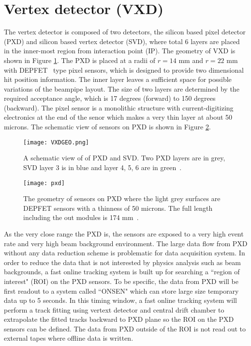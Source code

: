 \section{Vertex detector (VXD)}
The vertex detector is composed of two detectors, the silicon based pixel detector (PXD) and silicon based vertex detector (SVD), where total 6 layers are placed in the inner-most region from interaction point (IP).  The geometry of VXD is shown in Figure \ref{fig:svdgeo}. The PXD is placed at a radii of $r=14$ mm and $r=22$ mm with DEPFET~\cite{Abe:2010gxa} type pixel sensors, which is designed to provide two dimensional hit position information. The inner layer leaves a sufficient space for possible variations of the beampipe layout. The size of two layers are determined by the required acceptance angle, which is 17 degrees (forward) to 150 degrees (backward). The pixel sensor is a monolithic structure with current-digitizing electronics at the end of the senor which makes a very thin  layer at about 50 microns. The schematic view of sensors on PXD is shown in Figure \ref{fig:pxd}.
\begin{figure}[htpb]
	\centering
	\texttt{[image: VXDGEO.png]}
	\caption{A schematic view of of PXD and SVD. Two PXD layers are in grey, SVD layer 3 is in blue and layer 4, 5, 6 are in green~\cite{Abe:2010gxa}.}
	\label{fig:svdgeo}
\end{figure}
\begin{figure}[htpb]
\centering
\texttt{[image: pxd]}
\caption{The geometry of sensors on PXD where the light grey surfaces are DEPFET sensors with a thinness of 50 microns. The full length including the out modules is 174 mm~\cite{Abe:2010gxa}. }
\label{fig:pxd}
\end{figure}
 As the very close range the PXD is, the sensors are exposed to a very high event rate and very high beam background environment. The large data flow from PXD without any data reduction scheme is problematic for data acquisition system. In order to reduce the data that is not interested by physics analysis such as beam backgrounds, a fast online tracking system is built up for searching a ``region of interest" (ROI) on the PXD sensors. To be specific, the data from PXD will be first readout to a system called ``ONSEN" which can store large size temporary data up to 5 seconds. In this timing window, a fast online tracking system will perform a track fitting using vertext detector and central drift chamber to extrapolate the fitted tracks backward to PXD plane so the ROI on the PXD sensors can be defined. The data from PXD outside of the ROI is not read out to external tapes where offline data is written. 

